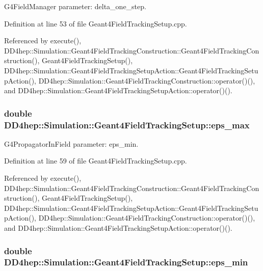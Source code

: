 G4FieldManager parameter: delta\_\-one\_\-step. 

Definition at line 53 of file Geant4FieldTrackingSetup.cpp.

Referenced by execute(), DD4hep::Simulation::Geant4FieldTrackingConstruction::Geant4FieldTrackingConstruction(), Geant4FieldTrackingSetup(), DD4hep::Simulation::Geant4FieldTrackingSetupAction::Geant4FieldTrackingSetupAction(), DD4hep::Simulation::Geant4FieldTrackingConstruction::operator()(), and DD4hep::Simulation::Geant4FieldTrackingSetupAction::operator()().\hypertarget{struct_d_d4hep_1_1_simulation_1_1_geant4_field_tracking_setup_a1402c7ed2e3696d92cd8a97b48d175bf}{
\subsubsection[{eps\_\-max}]{\setlength{\rightskip}{0pt plus 5cm}double {\bf DD4hep::Simulation::Geant4FieldTrackingSetup::eps\_\-max}}}
\label{struct_d_d4hep_1_1_simulation_1_1_geant4_field_tracking_setup_a1402c7ed2e3696d92cd8a97b48d175bf}


G4PropagatorInField parameter: eps\_\-min. 

Definition at line 59 of file Geant4FieldTrackingSetup.cpp.

Referenced by execute(), DD4hep::Simulation::Geant4FieldTrackingConstruction::Geant4FieldTrackingConstruction(), Geant4FieldTrackingSetup(), DD4hep::Simulation::Geant4FieldTrackingSetupAction::Geant4FieldTrackingSetupAction(), DD4hep::Simulation::Geant4FieldTrackingConstruction::operator()(), and DD4hep::Simulation::Geant4FieldTrackingSetupAction::operator()().\hypertarget{struct_d_d4hep_1_1_simulation_1_1_geant4_field_tracking_setup_afc80b1b5d836629561e474b3f2e501e5}{
\subsubsection[{eps\_\-min}]{\setlength{\rightskip}{0pt plus 5cm}double {\bf DD4hep::Simulation::Geant4FieldTrackingSetup::eps\_\-min}}}
\label{struct_d_d4hep_1_1_simulation_1_1_geant4_field_tracking_setup_afc80b1b5d836629561e474b3f2e501e5}


